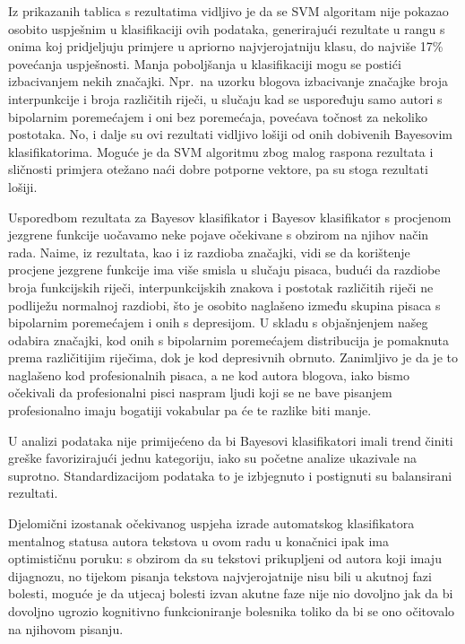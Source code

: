 \documentclass[10pt, a4paper]{article}
\begin{document}
Iz prikazanih tablica s rezultatima vidljivo je da se SVM algoritam nije pokazao osobito uspješnim u klasifikaciji ovih podataka, generirajući rezultate u rangu s onima koj pridjeljuju primjere u apriorno najvjerojatniju klasu, do najviše 17\% povećanja uspješnosti. Manja poboljšanja u klasifikaciji mogu se postići izbacivanjem nekih značajki. Npr.~na uzorku blogova izbacivanje značajke broja interpunkcije i broja različitih riječi, u slučaju kad se uspoređuju samo autori s bipolarnim poremećajem i oni bez poremećaja, povećava točnost za nekoliko postotaka. No, i dalje su ovi rezultati vidljivo lošiji od onih dobivenih Bayesovim klasifikatorima. Moguće je da SVM algoritmu zbog malog raspona rezultata i sličnosti primjera otežano naći dobre potporne vektore, pa su stoga rezultati lošiji. 

Usporedbom rezultata za Bayesov klasifikator i Bayesov klasifikator s procjenom jezgrene funkcije uočavamo neke pojave očekivane s obzirom na njihov način rada. Naime, iz rezultata, kao i iz razdioba značajki, vidi se da korištenje procjene jezgrene funkcije ima više smisla u slučaju pisaca, budući da razdiobe broja funkcijskih riječi, interpunkcijskih znakova i postotak različitih riječi ne podliježu normalnoj razdiobi, što je osobito naglašeno između skupina pisaca s bipolarnim poremećajem i onih s depresijom. U skladu s objašnjenjem našeg odabira značajki, kod onih s bipolarnim poremećajem distribucija je pomaknuta prema različitijim riječima, dok je kod depresivnih obrnuto. Zanimljivo je da je to naglašeno kod profesionalnih pisaca, a ne kod autora blogova, iako bismo očekivali da profesionalni pisci naspram ljudi koji se ne bave pisanjem profesionalno imaju bogatiji vokabular pa će te razlike biti manje.

U analizi podataka nije primijećeno da bi Bayesovi klasifikatori imali trend činiti greške favorizirajući jednu kategoriju, iako su početne analize ukazivale na suprotno. Standardizacijom podataka to je izbjegnuto i postignuti su balansirani rezultati.

Djelomični izostanak očekivanog uspjeha izrade automatskog klasifikatora mentalnog statusa autora tekstova u ovom radu u konačnici ipak ima optimističnu poruku: s obzirom da su tekstovi prikupljeni  od autora koji imaju dijagnozu, no tijekom pisanja tekstova najvjerojatnije nisu bili u akutnoj fazi bolesti, moguće je da utjecaj bolesti izvan akutne faze nije nio dovoljno jak da bi dovoljno ugrozio kognitivno funkcioniranje bolesnika toliko da bi se ono očitovalo na njihovom pisanju. 
\end{document}
